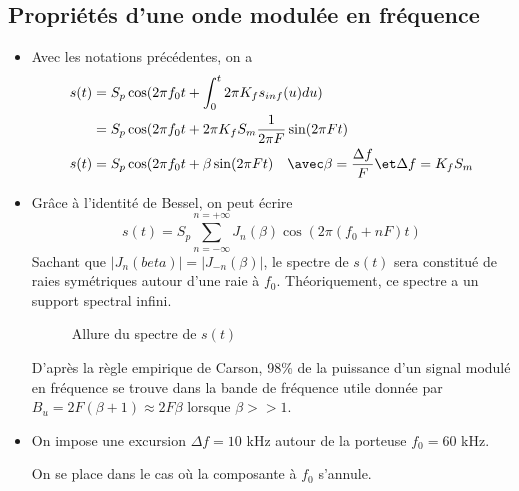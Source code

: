 \documentclass[../../Cours_M1.tex]{subfiles}
\begin{document}
\subsection*{Propriétés d'une onde modulée en fréquence}
\begin{itemize}\setlength{\itemsep}{10mm}
\item Avec les notations précédentes, on a 
\begin{align*}
s(t) & = S_p\cos(2\pi f_0 t + \int_0^t 2\pi K_f s_{inf}(u)du) \\
& = S_p\cos(2\pi f_0t + 2\pi K_f S_m \frac{1}{2\pi F} \sin(2\pi F t) \\
s(t) & = S_p\cos(2\pi f_0 t + \beta \sin(2\pi F t) \quad \avec \beta = \frac{\Delta f}{F} \et \Delta f = K_fS_m
\end{align*}

\item Grâce à l'identité de Bessel, on peut écrire
\[s(t) = S_p \sum_{n=-\infty}^{n=+\infty} J_n(\beta)\cos(2\pi (f_0+nF)t)\]
Sachant que $|J_n(beta)|=|J_{-n}(\beta)|$, le spectre de $s(t)$ sera constitué de raies symétriques autour d'une raie à $f_0$. Théoriquement, ce spectre a un support spectral infini.

\begin{figure}[h!]
\centering
{}
\caption{Allure du spectre de $s(t)$}
\end{figure}

D'après la règle empirique de Carson, 98\% de la puissance d'un signal modulé en fréquence se trouve dans la bande de fréquence utile donnée par $B_u = 2F(\beta +1) \approx2F\beta$ lorsque $\beta >>1$.

\item On impose une excursion $\Delta f = 10$ kHz autour de la porteuse $f_0=60$ kHz.

On se place dans le cas où la composante à $f_0$ s'annule.\\


\end{itemize}
\end{document}
